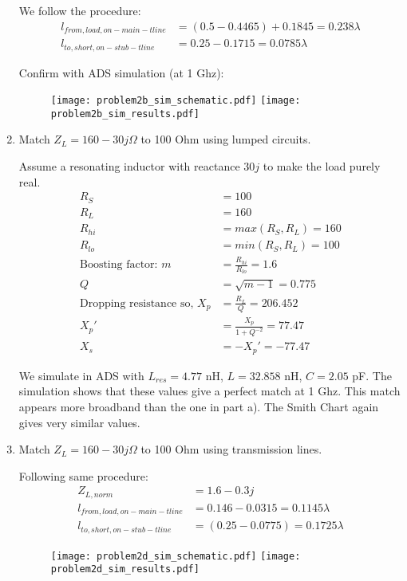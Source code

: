 \begin{enumerate}[label=(\alph*)]
    We follow the procedure:
    \begin{align*}
        l_{from,load,on-main-tline} &= (0.5 - 0.4465) + 0.1845 = 0.238 \lambda \\
        l_{to,short,on-stub-tline} &= 0.25 - 0.1715 = 0.0785 \lambda
    \end{align*}

    Confirm with ADS simulation (at 1 Ghz):
    \begin{figure}[H]
        \texttt{[image: problem2b\_sim\_schematic.pdf]}
        \endminipage\hfill
        \texttt{[image: problem2b\_sim\_results.pdf]}
        \endminipage
    \end{figure}

    \item Match $Z_L = 160 - 30j \Omega$ to 100 Ohm using lumped circuits.

    Assume a resonating inductor with reactance $30j$ to make the load purely real.
    \begin{align*}
        R_S &= 100 \\
        R_L &= 160 \\
        R_{hi} &= max(R_S, R_L) = 160 \\
        R_{lo} &= min(R_S, R_L) = 100 \\
        \text{Boosting factor: } m &= \frac{R_{hi}}{R_{lo}} = 1.6 \\
        Q &= \sqrt{m-1} = 0.775 \\
        \text{Dropping resistance so, } X_p &= \frac{R_L}{Q} = 206.452 \\
        X_p' &= \frac{X_p}{1 + Q^{-2}} = 77.47 \\
        X_s &= -X_p' = -77.47
    \end{align*}

    We simulate in ADS with $L_{res} = 4.77$ nH, $L = 32.858$ nH, $C = 2.05$ pF.
    The simulation shows that these values give a perfect match at 1 Ghz. This match appears more broadband than the one in part a). The Smith Chart again gives very similar values.

    \item Match $Z_L = 160-30j \Omega$ to 100 Ohm using transmission lines.

    Following same procedure:
    \begin{align*}
        Z_{L,norm} &= 1.6 - 0.3j \\
        l_{from,load,on-main-tline} &= 0.146 - 0.0315 = 0.1145 \lambda  \\
        l_{to,short,on-stub-tline} &= (0.25 - 0.0775) = 0.1725 \lambda
    \end{align*}
    \begin{figure}[H]
        \texttt{[image: problem2d\_sim\_schematic.pdf]}
        \endminipage\hfill
        \texttt{[image: problem2d\_sim\_results.pdf]}
        \endminipage
    \end{figure}


\end{enumerate}
